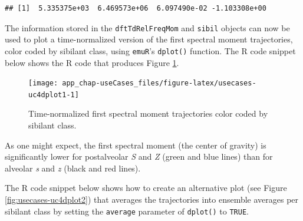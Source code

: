 \documentclass[]{book}
\newenvironment{Shaded}{\begin{snugshade}}{\end{snugshade}}
\newcommand{\DataTypeTok}[1]{\textcolor[rgb]{0.13,0.29,0.53}{#1}}
\newcommand{\DecValTok}[1]{\textcolor[rgb]{0.00,0.00,0.81}{#1}}
\newcommand{\KeywordTok}[1]{\textcolor[rgb]{0.13,0.29,0.53}{\textbf{#1}}}
\newcommand{\NormalTok}[1]{#1}
\newcommand{\OperatorTok}[1]{\textcolor[rgb]{0.81,0.36,0.00}{\textbf{#1}}}
\newcommand{\OtherTok}[1]{\textcolor[rgb]{0.56,0.35,0.01}{#1}}
\newcommand{\StringTok}[1]{\textcolor[rgb]{0.31,0.60,0.02}{#1}}
\begin{document}
\begin{verbatim}
## [1]  5.335375e+03  6.469573e+06  6.097490e-02 -1.103308e+00
\end{verbatim}

The information stored in the \texttt{dftTdRelFreqMom} and \texttt{sibil} objects can now be used to plot a time-normalized version of the first spectral moment trajectories, color coded by sibilant class, using \texttt{emuR}'s \texttt{dplot()} function. The R code snippet below shows the R code that produces Figure \ref{fig:usecases-uc4dplot1}.

\begin{Shaded}
\end{Shaded}

\begin{figure}

{\centering \texttt{[image: app\_chap-useCases\_files/figure-latex/usecases-uc4dplot1-1]} 

}

\caption{Time-normalized first spectral moment trajectories color coded by sibilant class.}\label{fig:usecases-uc4dplot1}
\end{figure}

As one might expect, the first spectral moment (the center of gravity) is significantly lower for postalveolar \emph{S} and \emph{Z} (green and blue lines) than for alveolar \emph{s} and \emph{z} (black and red lines).

The R code snippet below shows how to create an alternative plot (see Figure \ref{fig:usecases-uc4dplot2}) that averages the trajectories into ensemble averages per sibilant class by setting the \texttt{average} parameter of \texttt{dplot()} to \texttt{TRUE}.

\begin{Shaded}
\end{Shaded}
\end{document}
